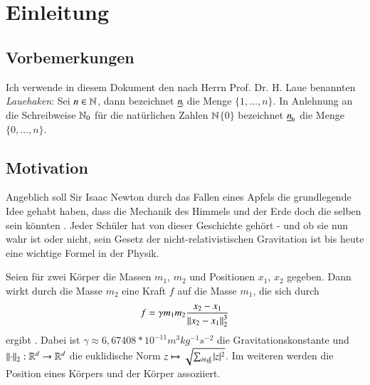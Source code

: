 \chapter{Einleitung}
\label{ch:einl}
  \section*{Vorbemerkungen}
    Ich verwende in diesem Dokument den nach Herrn Prof. Dr. H. Laue benannten \textit{Lauehaken}: Sei $n \in \mathbb{N}$, dann bezeichnet $\haken{n}$ die Menge $\{1, \dots ,n\}$.
    In Anlehnung an die Schreibweise $\mathbb{N}_0$ für die natürlichen Zahlen $\mathbb{N}$$\{0\}$ bezeichnet $\nullhaken{n}$ die Menge $\{0, \dots , n\}$.
    
  \section{Motivation}
  \label{sec:mot}
    Angeblich soll Sir Isaac Newton durch das Fallen eines Apfels die grundlegende Idee gehabt haben, dass die Mechanik des Himmels und der Erde doch die selben sein 
    könnten \citep{memoirs}. Jeder Schüler hat von dieser Geschichte gehört - und ob sie nun wahr ist oder nicht, sein Gesetz der nicht-relativistischen Gravitation ist bis
    heute eine wichtige Formel in der Physik.
    
    Seien für zwei Körper die Massen $m_1$, $m_2$ und Positionen $x_1$, $x_2$ gegeben. Dann wirkt durch die Masse $m_2$ eine Kraft $f$ auf die Masse $m_1$, die sich durch 
    \begin{equation}
      f = \gamma m_1 m_2 \frac{x_2 - x_1}{\left\lVert x_2 - x_1\right\rVert^3_2}
      \label{eq:simple_grav}
    \end{equation}
    ergibt \citep{newton}. Dabei ist $\gamma \approx 6{,}67408*10^{-11} m^3 kg^{-1} s^{-2}$ die Gravitationskonstante \citep{graviconst} und $\left\lVert\cdot\right\rVert_2: \mathbb{R}^d \to \mathbb{R}^d$ die 
    euklidische Norm $z \mapsto \sqrt{ \sum_{i \in \haken{d}} |z|^2 }$. Im weiteren werden die Position eines Körpers und der Körper assoziiert. 
    
